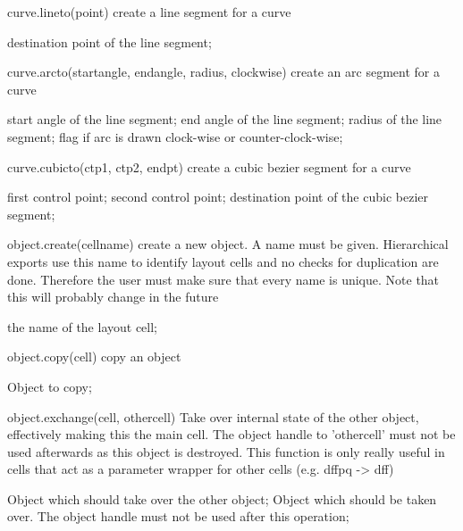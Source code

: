 \begin{APIfunc}{curve.lineto(point)}
    create a line segment for a curve
    \begin{APIparameters}
            destination point of the line segment;
    \end{APIparameters}
\end{APIfunc}
\begin{APIfunc}{curve.arcto(startangle, endangle, radius, clockwise)}
    create an arc segment for a curve
    \begin{APIparameters}
            start angle of the line segment;
            end angle of the line segment;
            radius of the line segment;
            flag if arc is drawn clock-wise or counter-clock-wise;
    \end{APIparameters}
\end{APIfunc}
\begin{APIfunc}{curve.cubicto(ctp1, ctp2, endpt)}
    create a cubic bezier segment for a curve
    \begin{APIparameters}
            first control point;
            second control point;
            destination point of the cubic bezier segment;
    \end{APIparameters}
\end{APIfunc}
\begin{APIfunc}{object.create(cellname)}
    create a new object. A name must be given. Hierarchical exports use this name to identify layout cells and no checks for duplication are done. Therefore the user must make sure that every name is unique. Note that this will probably change in the future
    \begin{APIparameters}
            the name of the layout cell;
    \end{APIparameters}
\end{APIfunc}
\begin{APIfunc}{object.copy(cell)}
    copy an object
    \begin{APIparameters}
            Object to copy;
    \end{APIparameters}
\end{APIfunc}
\begin{APIfunc}{object.exchange(cell, othercell)}
    Take over internal state of the other object, effectively making this the main cell. The object handle to 'othercell' must not be used afterwards as this object is destroyed. This function is only really useful in cells that act as a parameter wrapper for other cells (e.g. dffpq -> dff)
    \begin{APIparameters}
            Object which should take over the other object;
            Object which should be taken over. The object handle must not be used after this operation;
    \end{APIparameters}
\end{APIfunc}
